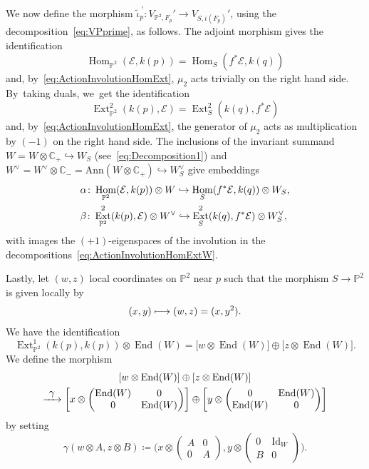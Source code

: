 \documentclass[11pt]{article}
\newcommand\mto{\mathchoice{\longmapsto}{\mapsto}{\mapsto}{\mapsto}}
\newcommand\hto{\mathrel{\lhook\joinrel\to}}
\newcommand\To[1]{\mathchoice{\xrightarrow{\textstyle\kern4pt#1\kern3pt}}{\stackrel{#1}{\longrightarrow}}{}{}}
\newcommand{\CC}{{\mathbb C}}\let\C\CC
\newcommand{\PP}{{\mathbb P}}\let\P\PP
\newcommand\cE{\mathcal{E}}
\DeclareMathOperator{\End}{End}
\DeclareMathOperator{\Ext}{Ext}
\DeclareMathOperator{\Hom}{Hom}
\DeclareMathOperator{\Id}{Id}
\theoremstyle{definition}
\begin{document}
We now define the morphism $\widetilde{\iota}_p^{\ \prime}\colon V_{\PP^2,F_p}'\to V_{S,\overline{\iota}(F_p)}'$, using the decomposition~\eqref{eq:VPprime}, as follows.
The adjoint morphism gives the identification
\[
\Hom_{\PP^2}(\cE,k(p))=\Hom_{S}(f^*\cE,k(q))
\]
and, by~\eqref{eq:ActionInvolutionHomExt}, $\mu_2$ acts trivially on the right hand side. By~taking duals, we~get the identification
\[
\Ext^2_{\PP^2}(k(p),\cE)=\Ext^2_{S}(k(q),f^*\cE)
\]
and, by~\eqref{eq:ActionInvolutionHomExt}, the generator of $\mu_2$ acts as multiplication by $(-1)$ on the right hand side.
The inclusions of the invariant summand $W=W\otimes\C_+\hookrightarrow W_S$ (see~\eqref{eq:Decomposition1}) and~$W^{\vee}=W^{\vee}\otimes\C_-=\mathrm{Ann}(W\otimes\CC_{+})\hookrightarrow W_S^{\vee}$ give embeddings
\begin{equation}\label{eq:DefOfIotaHatFirstTwoFactors}
\begin{split}
&\alpha\colon \Hom_{\PP^2}(\cE,k(p))\otimes W \hto \Hom_{S}(f^*\cE,k(q))\otimes W_S,\\
&\beta\colon \Ext^2_{\PP^2}(k(p),\cE)\otimes W^\vee\hto \Ext^2_{S}(k(q),f^*\cE)\otimes W_S^\vee,
\end{split}
\end{equation}
with images the $(+1)$-eigenspaces of the involution in the decompositions~\eqref{eq:ActionInvolutionHomExtW}.

Lastly, let $(w,z)$ local coordinates on $\PP^2$ near $p$ such that the morphism $S\to\PP^2$ is given locally by
\[
(x,y)\mto (w,z)=(x,y^2).
\]
We have the identification
\[
\Ext^1_{\PP^2}(k(p),k(p))\otimes \End(W)=\bigl[w\otimes \End(W)\bigr] \oplus \bigl[z\otimes \End(W)\bigr].
\]
We define the morphism
\begin{multline}
\left[w\otimes \End(W)\right] \oplus \left[z\otimes \End(W)\right] \\
\To{\gamma}\left[x \otimes \begin{pmatrix}\End(W)&0\\0&\End(W)\end{pmatrix}\right] \oplus \left[y\otimes \begin{pmatrix}0&\End(W)\\ \End(W)&0\end{pmatrix}\right]
\end{multline}
by setting
\begin{equation}\label{eq:MorphismPhi}
\gamma\left(w\otimes A,z\otimes B\right)\coloneqq\biggl(x \otimes \begin{pmatrix}A&0\\0&A\end{pmatrix},y\otimes \begin{pmatrix}0&\Id_W\\ B&0\end{pmatrix}\biggr).
\end{equation}
\end{document}
